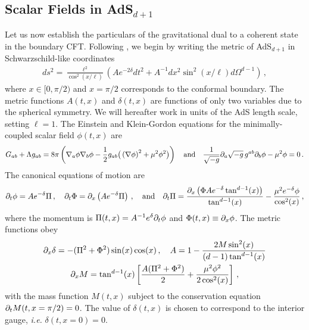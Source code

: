 \documentclass[../PhD.tex]{subfiles}
\begin{document}

\subsection{Scalar Fields in AdS$_{d+1}$}

Let us now establish the particulars of the gravitational dual to a coherent state in the boundary CFT. Following \cite{1508.02709}, we begin by writing the metric of AdS$_{d+1}$ in Schwarzschild-like coordinates 
\begin{align}
ds^2 = \frac{\ell^2}{\cos^2 \left(x / \ell \right)} \left( A e^{-2\delta} dt^2 + A^{-1}dx^2 \sin^2 \left(x / \ell \right) d\Omega^{d-1} \right) \, ,
\end{align}
where $x \in [0, \pi/2)$ and $x = \pi / 2$ corresponds to the conformal boundary. The metric functions $A(t,x)$ and $\delta(t,x)$ are functions of only two variables due to the spherical symmetry. We will hereafter work in units of the AdS length scale, setting $\ell = 1$. The Einstein and Klein-Gordon equations for the minimally-coupled scalar field $\phi(t,x)$ are
\begin{align}
G_{ab} + \Lambda g_{ab} = 8\pi \left( \nabla_a \phi \nabla_b \phi - \frac{1}{2} g_{ab} \big( \left( \nabla \phi \right)^2 + \mu^2 \phi^2 \big) \right) \quad \text{and} \quad \frac{1}{\sqrt{-g}} \partial_a \sqrt{-g} \, g^{ab} \partial_b \phi - \mu^2 \phi = 0 \, .
\end{align}
The canonical equations of motion are \cite{1210.1566}
\begin{align}
\label{canon eqns}
\partial_t \phi = A e^{-\delta} \Pi \, , \quad \partial_t \Phi = \partial_x \left( A e^{-\delta} \Pi \right) \, , \quad \text{and} \quad \partial_t \Pi = \frac{\partial_x \left( \Phi A e^{-\delta} \tan^{d-1} (x) \right)}{\tan^{d-1}(x)} - \frac{\mu^2 e^{-\delta} \phi}{\cos^2 (x)} \, ,
\end{align}
where the momentum is $\Pi(t,x) = A^{-1} e^{\delta} \partial_t \phi$ and $\Phi(t,x) \equiv \partial_x \phi$. The metric functions obey
\begin{align}
\label{metric funcs}
\begin{gathered}
\partial_x \delta = - (\Pi^2 + \Phi^2 ) \sin (x) \cos(x) \, , \quad A = 1 - \frac{2M \sin^2 (x) }{(d-1) \tan^{d-1}(x)} \\
\partial_x M = \tan^{d-1}(x) \left[ \frac{A (\Pi^2 + \Phi^2)}{2} + \frac{\mu^2 \phi^2}{2 \cos^2 (x)} \right] \, ,
\end{gathered}
\end{align}
with the mass function $M(t,x)$ subject to the conservation equation $\partial_t M( t, x = \pi/2) = 0$. The value of $\delta(t,x)$ is chosen to correspond to the interior gauge, {\it i.e.} $\delta(t,x=0) = 0$. 
\end{document}
